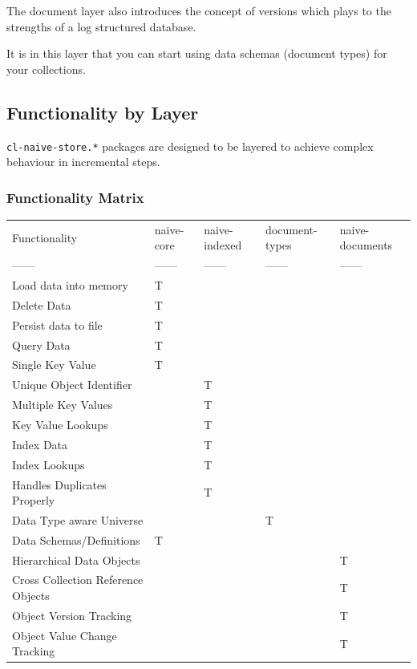 \documentclass[11pt]{article}
\begin{document}
The document layer also introduces the concept of versions which plays
to the strengths of a log structured database.

It is in this layer that you can start using data schemas (document
types) for your collections.

\subsection{Functionality by Layer}
\label{sec:orga498d0d}

\texttt{cl-naive-store.*} packages are designed to be layered to achieve complex
behaviour in incremental steps.

\subsubsection{Functionality Matrix}
\label{sec:orgbcc9e04}

\begin{center}
\begin{tabular}{lllll}
Functionality & naive-core & naive-indexed & document-types & naive-documents\\[0pt]
------ & ------ & ------ & ------ & ------\\[0pt]
Load data into memory & T &  &  & \\[0pt]
Delete Data & T &  &  & \\[0pt]
Persist data to file & T &  &  & \\[0pt]
Query Data & T &  &  & \\[0pt]
Single Key Value & T &  &  & \\[0pt]
Unique Object Identifier &  & T &  & \\[0pt]
Multiple Key Values &  & T &  & \\[0pt]
Key Value Lookups &  & T &  & \\[0pt]
Index Data &  & T &  & \\[0pt]
Index Lookups &  & T &  & \\[0pt]
Handles Duplicates Properly &  & T &  & \\[0pt]
Data Type aware Universe &  &  & T & \\[0pt]
Data Schemas/Definitions & T &  &  & \\[0pt]
Hierarchical Data Objects &  &  &  & T\\[0pt]
Cross Collection Reference Objects &  &  &  & T\\[0pt]
Object Version Tracking &  &  &  & T\\[0pt]
Object Value Change Tracking &  &  &  & T\\[0pt]
\end{tabular}
\end{center}
\end{document}
